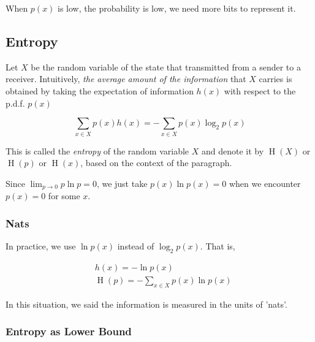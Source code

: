 \documentclass{article}
\begin{document}
            When $ p(x) $ is low, the probability is low, we need more bits to
            represent it.

        \subsection{Entropy}

            Let $ X $ be the random variable of the state that transmitted from
            a sender to a receiver. Intuitively, \textit{the average amount of
            the information} that $ X $ carries is obtained by taking the
            expectation of information $ h(x) $ with respect to the p.d.f.
            $ p(x) $

            \begin{equation*}
                 \sum_{x \in X} p(x) h(x) = - \sum_{x \in X} p(x) \log_2 p(x)
            \end{equation*}

            This is called the \textit{entropy} of the random variable $ X $
            and denote it by $ \operatorname{H}(X) $ or $ \operatorname{H}(p) $
            or $ \operatorname{H}(x) $, based on the context of the paragraph.

            Since $ \lim_{p \rightarrow 0} p \ln p = 0 $,
            we just take $ p(x) \ln p(x) = 0 $ when we encounter $ p(x) = 0 $ for some
            $ x $.
            
            \subsubsection{Nats}

                In practice, we use $ \ln p(x)$ instead of $\log_2 p(x) $. That
                is,

                \begin{align*}
                    &h(x)                = - \ln p(x) \\
                    &\operatorname{H}(p) = - \sum_{x \in X} p(x) \ln p(x)
                \end{align*}

                In this situation, we said the information is measured in the
                units of 'nats'.

            \subsubsection{Entropy as Lower Bound}
\end{document}
